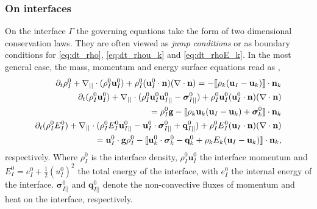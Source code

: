 \subsubsection{On interfaces}

On the interface $\Gamma$ the governing equations take the form of two dimensional conservation laws. 
They are often viewed as \textit{jump conditions} or as boundary conditions for  \ref{eq:dt_rho}, \ref{eq:dt_rhou_k} and \ref{eq:dt_rhoE_k}. 
In the most general case, the mass, momentum and energy surface equations read as \citep{ishii2010thermo,morel2015mathematical,bothe2022sharp}, 
\begin{align}
    \label{eq:dt_rhoI}
    \partial_t \rho_I^0
    + \mathbf{\nabla}_{||}\cdot (\rho_I^0\textbf{u}_{I}^0)
    + \rho_I^0 (\textbf{u}_I^0 \cdot \textbf{n})(\mathbf{\nabla}\cdot \textbf{n})
    = 
    -\llbracket 
        \rho_k (\textbf{u}_I - \textbf{u}_k)
     \rrbracket \cdot \textbf{n}_k
    \\
    \partial_t (\rho_I^0\textbf{u}_I^0)  
    + \mathbf{\nabla}_{||}\cdot (
        \rho_I^0\textbf{u}_{I}^0\textbf{u}_{I||}^0
        - \bm{\sigma}_{I||}^0)
        + \rho_I^0 \textbf{u}_I^0 (\textbf{u}_I^0 \cdot \textbf{n})(\mathbf{\nabla}\cdot \textbf{n}) \nonumber\\
    = 
    \rho_I^0 \textbf{g} 
    - \llbracket 
        \rho_k \textbf{u}_k (\textbf{u}_I - \textbf{u}_k)
        + \bm\sigma^0_k
     \rrbracket \cdot \textbf{n}_k
    \\
    \label{eq:dt_rhoIE_I}
    \partial_t (\rho_I^0E_I^0)  
    + \mathbf{\nabla}_{||}\cdot (
        \rho_I^0 E_I^0\textbf{u}_{I||}^0
        - \textbf{u}_I^0 \cdot \bm{\sigma}_{I||}^0 
        + \textbf{q}_{I||}^0
        )
    + \rho_I^0E_I^0  (\textbf{u}_I \cdot \textbf{n})(\mathbf{\nabla}\cdot \textbf{n})\nonumber\\
    = 
    \textbf{u}_I^0 \cdot \textbf{g}  \rho_I^0 
    - \llbracket \textbf{u}_k^0 \cdot \bm{\sigma}_k^0 - \textbf{q}_k^0
    + \rho_k E_k (\textbf{u}_I - \textbf{u}_k)
     \rrbracket \cdot \textbf{n}_k,
\end{align} 
respectively.
Where $\rho_I^0$ is the interface density, $\rho_I^0\textbf{u}_I^0$ the interface momentum 
and $E_I^0 = e_I^0 + \frac{1}{2}(u_I^0)^2$ the total energy of the interface, with $e_I^0$ the internal energy of the interface.
$\bm{\sigma}_{I||}^0$ and $\textbf{q}_{I||}^0$ denote the non-convective fluxes of momentum and heat on the interface, respectively.


